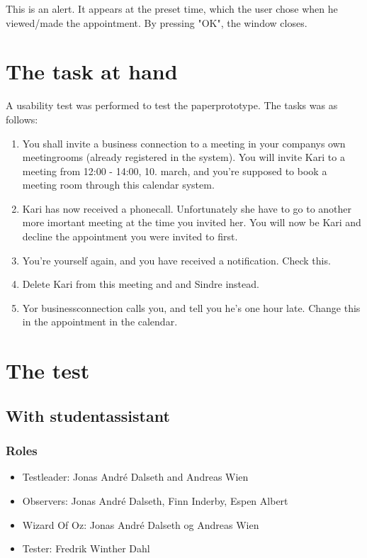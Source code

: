 \documentclass{article}
\begin{document}
This is an alert. It appears at the preset time, which the user chose when he viewed/made the appointment. By pressing "OK", the window closes.

\newpage



\section{The task at hand}
A usability test was performed to test the paperprototype. The tasks was as follows:
\begin{enumerate}

\item You shall invite a business connection to a meeting in your companys own meetingrooms (already registered in the system). You will invite Kari to a meeting from 12:00 - 14:00, 10. march, and you're supposed to book a meeting room through this calendar system.

\item Kari has now received a phonecall. Unfortunately she have to go to another more imortant meeting at the time you invited her. You will now be Kari and decline the appointment you were invited to first.

\item You're yourself again, and you have received a notification. Check this.

\item Delete Kari from this meeting and and Sindre instead.

\item Yor businessconnection calls you, and tell you he's one hour late. Change this in the appointment in the calendar.
\end{enumerate}







\section{The test}
\subsection{With studentassistant}
\subsubsection*{Roles}
\begin{itemize}
\item Testleader: Jonas André Dalseth and Andreas Wien
\item Observers: Jonas André Dalseth, Finn Inderby, Espen Albert
\item Wizard Of Oz: Jonas André Dalseth og Andreas Wien
\item Tester: Fredrik Winther Dahl
\end{itemize}
\end{document}
